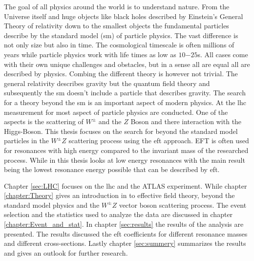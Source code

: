 \documentclass[../Bachelorarbeit.tex]{subfiles}
\begin{document}
The goal of all physics around the world is to understand nature. From the Universe itself and huge objects like black holes described by Einstein's General Theory of relativity down to the smallest objects the fundamental particles describe by the standard model (\acrshort{sm}) of particle physics.
The vast difference is not only size but also in time. The cosmological timescale is often millions of years while particle physics work with life times as low as $10{-25}$s.
All cases come with their own unique challenges and obstacles, but in a sense all are equal all are described by physics. Combing the different theory is however not trivial.
The general relativity describes gravity but the quantum field theory and subsequently the \acrshort{sm} doesn't include a particle that describes gravity. The search for a theory beyond the \acrshort{sm} is an important aspect of modern physics.
At the \acrfull{lhc} measurement for most aspect of particle physics are conducted. One of the aspects is the scattering of $W^{\pm }$ and the $Z$ Boson and there interaction with the Higgs-Boson.
This thesis focuses on the search for beyond the standard model particles in the $W^{\pm}Z$ scattering process using the \acrfull{eft} approach.
EFT is often used for resonances with high energy compared to the invariant mass of the researched process. While in this thesis looks at low energy resonances with the main result being the lowest resonance energy possible that can be described by \acrshort{eft}.

Chapter \ref{sec:LHC} focuses on the \acrfull{lhc} and the ATLAS experiment.
While chapter \ref{chapter:Theory} gives an introduction in to effective field theory, beyond the standard model physics and the $W^{\pm}Z$ vector boson scattering process. The event selection and the statistics used to analyze the data are discussed in chapter \ref{chapter:Event_and_stat}.
In chapter \ref{sec:results} the results of the analysis are presented. The results discussed the \acrshort{eft} coefficients for different resonance masses and different cross-sections.
Lastly chapter \ref{sec:summery} summarizes the results and gives an outlook for further research.
\end{document}
